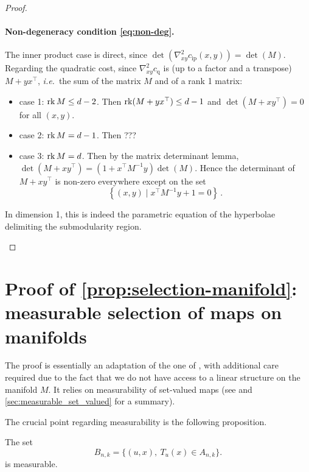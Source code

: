 \begin{proof}
\paragraph{Non-degeneracy condition \cref{eq:non-deg}.}
The inner product case is direct, since $\det(\nabla ^{2}_{xy}c_{\text{ip}}(x,y))=\det(M)$. Regarding the quadratic cost, since $\nabla^{2}_{xy}c_{\text{q}}$ is (up to a factor and a transpose) $M+yx^\top$, \textit{i.e.}~the sum of the matrix $M$ and of a rank 1 matrix:
\begin{itemize}[nolistsep]
    \item case 1: $\operatorname*{rk} M \leq d-2$. Then $\operatorname*{rk}(M+yx^\top) \leq d-1$ and $\det(M+xy^\top)=0$ for all $(x,y)$.
    \item case 2: $\operatorname*{rk} M = d-1$. Then ???
    \item case 3: $\operatorname*{rk} M = d$. Then by the matrix determinant lemma, $\det(M+xy^\top)=(1+x^\top M^{-1}y)\det (M)$. Hence the determinant of $M+xy^\top$ is non-zero everywhere except on the set $$\left\{ (x,y)\mid x^\top M^{-1}y+1=0 \right\}\,.$$
\end{itemize}
\begin{remark}
    In dimension 1, this is indeed the parametric equation of the hyperbolae delimiting the submodularity region. \qedhere
\end{remark}
\end{proof}



\section{Proof of \cref{prop:selection-manifold}: measurable selection of maps on manifolds}
\label{sec:appendix-proof-fontbona-manifold}
The proof is essentially an adaptation of the one of \cite{fontbona2010measurability}, with additional care required due to the fact that we do not have access to a linear structure on the manifold $M$. It relies on measurability of set-valued maps (see \cite[Ch.~5 and 14]{rockafellar2009variational} and \cref{sec:measurable_set_valued} for a summary).

The crucial point regarding measurability is the following proposition.

\begin{proposition}\label{prop:Bnk_measurable}
    The set
    \begin{equation}
        B_{n,k} = \{ (u,x),\ T_u(x) \in A_{n,k} \}.
    \end{equation}
    is measurable.
\end{proposition}

